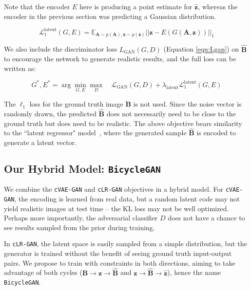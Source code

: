 Note that the encoder $E$ here is producing a point estimate for $\widehat{\mathbf{z}}$, whereas the encoder in the previous section was predicting a Gaussian distribution.

\begin{equation}
\mathcal{L}_{1}^{\text{latent}}(G,E) = \mathds{E}_{\mathbf{A}\sim p(\mathbf{A}),\mathbf{z}\sim p(\mathbf{z})} ||\mathbf{z} - E(G(\mathbf{A},\mathbf{z})) ||_1
\label{eqn:L1_lacyc}
\end{equation}

We also include the discriminator loss $L_{\text{GAN}}(G,D)$ (Equation \ref{eqn:Lgan}) on $\widehat{\mathbf{B}}$ to encourage the network to generate realistic results, and the full loss can be written as:

\begin{equation}
G^{*}, E^{*} = \arg\min_{G,E} \max_D \quad \mathcal{L}_{\text{GAN}}(G,D) + \lambda_{\text{latent}} \mathcal{L}_1^{\text{latent}}(G,E)
\label{fig:L}
\end{equation}

The $\ell_1$ loss for the ground truth image $\mathbf{B}$ is not used. Since the noise vector is randomly drawn, the predicted $\widehat{\mathbf{B}}$ does not necessarily need to be close to the ground truth but does need to be realistic. The above objective bears similarity to the ``latent regressor" model~\citep{donahue2016adversarial,dumoulin2016adversarially,xi2016infogan}, where the generated sample $\widehat{\mathbf{B}}$ is encoded to generate a latent vector.

\subsection{Our Hybrid Model: \texttt{BicycleGAN}}
\label{sec:finalMethod}
We combine the \texttt{cVAE-GAN} and \texttt{cLR-GAN} objectives in a hybrid model. For \texttt{cVAE-GAN}, the encoding is learned from real data, but a random latent code may not yield realistic images at test time -- the KL loss may not be well optimized. Perhaps more importantly, the adversarial classifier $D$ does not have a chance to see results sampled from the prior during training. 

In \texttt{cLR-GAN}, the latent space is easily sampled from a simple distribution, but the generator is trained without the benefit of seeing ground truth input-output pairs. We propose to train with constraints in both directions, aiming to take advantage of both cycles ($\mathbf{B} \rightarrow \mathbf{z} \rightarrow \widehat{\mathbf{B}}$ and $\mathbf{z} \rightarrow \widehat{\mathbf{B}} \rightarrow \widehat{\mathbf{z}}$), hence the name \texttt{BicycleGAN}.


